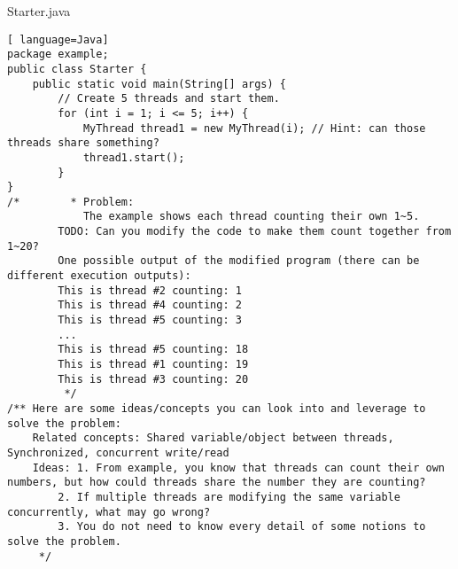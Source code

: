 \documentclass[manuscript,screen,nonacm]{acmart}
\begin{document}
\begin{appendices}
Starter.java
\begin{lstlisting}[ language=Java]
package example;
public class Starter {
    public static void main(String[] args) {
        // Create 5 threads and start them.
        for (int i = 1; i <= 5; i++) {
            MyThread thread1 = new MyThread(i); // Hint: can those threads share something?
            thread1.start();
        }
}
/*        * Problem:
            The example shows each thread counting their own 1~5.
        TODO: Can you modify the code to make them count together from 1~20?
        One possible output of the modified program (there can be different execution outputs):
        This is thread #2 counting: 1
        This is thread #4 counting: 2
        This is thread #5 counting: 3
        ...
        This is thread #5 counting: 18
        This is thread #1 counting: 19
        This is thread #3 counting: 20
         */
/** Here are some ideas/concepts you can look into and leverage to solve the problem:
    Related concepts: Shared variable/object between threads, Synchronized, concurrent write/read
    Ideas: 1. From example, you know that threads can count their own numbers, but how could threads share the number they are counting?
        2. If multiple threads are modifying the same variable concurrently, what may go wrong?
        3. You do not need to know every detail of some notions to solve the problem.
     */
\end{lstlisting}

\end{appendices}


  
\end{document}
